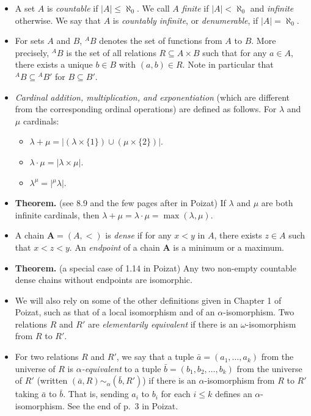 \documentclass{amsart}
\theoremstyle{definition}
\newcommand{\bA}{\mathbf{A}}
\newcommand{\ba}{\bar{a}}
\newcommand{\bb}{\bar{b}}
\newcommand{\fct}[2]{{}^{#1}{#2}}
\begin{document}
\begin{itemize}
\item A set $A$ is \emph{countable} if $|A| \le \aleph_0$. We call $A$ \emph{finite} if $|A| < \aleph_0$ and \emph{infinite} otherwise. We say that $A$ is \emph{countably infinite}, or \emph{denumerable}, if $|A| = \aleph_0$.
\item For sets $A$ and $B$, $\fct{A}{B}$ denotes the set of functions from $A$ to $B$. More precisely, $\fct{A}{B}$ is the set of all relations $R \subseteq A \times B$ such that for any $a \in A$, there exists a unique $b \in B$ with $(a, b) \in R$. Note in particular that $\fct{A}{B} \subseteq \fct{A}{B'}$ for $B \subseteq B'$.
\item \emph{Cardinal addition, multiplication, and exponentiation} (which are different from the corresponding ordinal operations) are defined as follows. For $\lambda$ and $\mu$ cardinals:
  \begin{itemize}
  \item $\lambda + \mu = |(\lambda \times \{1\}) \cup (\mu \times \{2\})|$.
  \item $\lambda \cdot \mu = |\lambda \times \mu|$.
  \item $\lambda^\mu = |\fct{\mu}{\lambda}|$.
  \end{itemize}
\item \textbf{Theorem.} (see 8.9 and the few pages after in Poizat) If $\lambda$ and $\mu$ are both infinite cardinals, then $\lambda + \mu = \lambda \cdot \mu = \max (\lambda, \mu)$.
\item A chain $\bA = (A, <)$ is \emph{dense} if for any $x < y$ in $A$, there exists $z \in A$ such that $x < z < y$. An \emph{endpoint} of a chain $\bA$ is a minimum or a maximum.
\item \textbf{Theorem.} (a special case of 1.14 in Poizat) Any two non-empty countable dense chains without endpoints are isomorphic.
\item We will also rely on some of the other definitions given in Chapter 1 of Poizat, such as that of a local isomorphism and of an $\alpha$-isomorphism. Two relations $R$ and $R'$ are \emph{elementarily equivalent} if there is an $\omega$-isomorphism from $R$ to $R'$.
\item For two relations $R$ and $R'$, we say that a tuple $\ba = (a_1, \ldots, a_k)$ from the universe of $R$ is \emph{$\alpha$-equivalent} to a tuple $\bb = (b_1, b_2, \ldots, b_k)$ from the universe of $R'$ (written $(\ba, R) \sim_\alpha (\bb, R')$) if there is an $\alpha$-isomorphism from $R$ to $R'$ taking $\ba$ to $\bb$. That is, sending $a_i$ to $b_i$ for each $i \le k$ defines an $\alpha$-isomorphism. See the end of p.~3 in Poizat.

\end{itemize}
\end{document}
